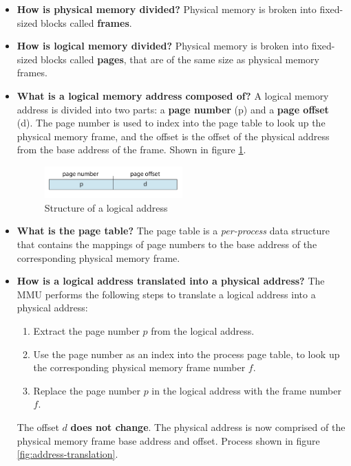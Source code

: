 \documentclass[12pt]{article}
\begin{document}
\begin{itemize}
    \item \textbf{How is physical memory divided?} Physical memory is broken into fixed-sized blocks called \textbf{frames}.
    \item \textbf{How is logical memory divided?} Physical memory is broken into fixed-sized blocks called \textbf{pages}, that are of the same size as physical memory frames.
    \item \textbf{What is a logical memory address composed of?} A logical memory address is divided into two parts: a \textbf{page number} (p) and a \textbf{page offset} (d). The page number is used to index into the page table to look up the physical memory frame, and the offset is the offset of the physical address from the base address of the frame. Shown in figure \ref{fig:logical-address}.
        \begin{figure}[ht]
            \centering
            \includegraphics[width=0.5\textwidth]{figures/logical-address.jpg}
            \caption{Structure of a logical address}
            \label{fig:logical-address}
        \end{figure}
    \item \textbf{What is the page table?} The page table is a \textit{per-process} data structure that contains the mappings of page numbers to the base address of the corresponding physical memory frame.
    \item \textbf{How is a logical address translated into a physical address?} The MMU performs the following steps to translate a logical address into a physical address:
        \begin{enumerate}
            \item Extract the page number \(p\) from the logical address.
            \item Use the page number as an index into the process page table, to look up the corresponding physical memory frame number \(f\).
            \item Replace the page number \(p\) in the logical address with the frame number \(f\).
        \end{enumerate}
        The offset \(d\) \textbf{does not change}. The physical address is now comprised of the physical memory frame base address and offset. Process shown in figure \ref{fig:address-translation}.

\end{itemize}
\end{document}
